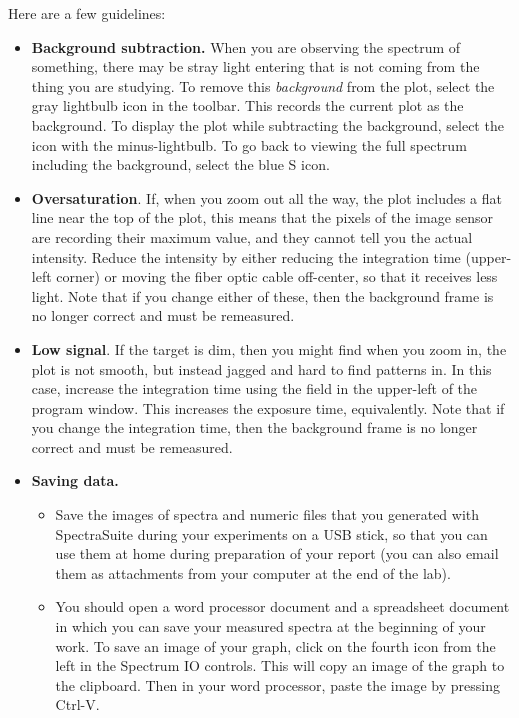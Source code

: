 Here are a few guidelines:
\begin{itemize}
	
	\item \textbf{Background subtraction.} When you are observing the spectrum of something, there may be stray light entering that is not coming from the thing you are studying. To remove this \textit{background} from the plot, select the gray lightbulb icon in the toolbar. This records the current plot as the background. To display the plot while subtracting the background, select the icon with the minus-lightbulb. To go back to viewing the full spectrum including the background, select the blue S icon.

	\item \textbf{Oversaturation}. If, when you zoom out all the way, the plot includes a flat line near the top of the plot, this means that the pixels of the image sensor are recording their maximum value, and they cannot tell you the actual intensity. Reduce the intensity by either reducing the integration time (upper-left corner) or moving the fiber optic cable off-center, so that it receives less light. Note that if you change either of these, then the background frame is no longer correct and must be remeasured.

	\item \textbf{Low signal}. If the target is dim, then you might find when you zoom in, the plot is not smooth, but instead jagged and hard to find patterns in. In this case, increase the integration time using the field in the upper-left of the program window. This increases the exposure time, equivalently. Note that if you change the integration time, then the background frame is no longer correct and must be remeasured.

	\item \textbf{Saving data.}
	
	\begin{itemize}
		\item Save the images of spectra and numeric files that you generated with SpectraSuite
	during your experiments on a USB stick, so that you can use them at home during
	preparation of your report (you can also email them as attachments from your
	computer at the end of the lab).
	
	\item You should open a word processor document and a spreadsheet document in which you can save your measured
	spectra at the beginning of your work. To save an image of your graph, click on
	the fourth icon from the left in the Spectrum IO controls. %
	This will copy
	an image of the graph to the clipboard. Then in your word processor, paste the image by pressing
	Ctrl-V.
	

\end{itemize}
\end{itemize}
